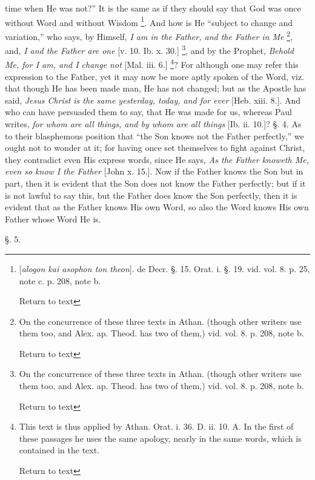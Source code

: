 time when He was not?'' It is the same as if they should say that God
was once without Word and without Wisdom \footnote{[\emph{alogon kai asophon ton theon}]. de Decr. §. 15. Orat. i. §.
19. vid. vol. 8. p. 25, note c. p. 208, note b.

Return to text}. And how is He ``subject to change and variation,'' who says, by
Himself, \emph{I am in the Father, and the Father in Me} \footnote{On the concurrence of these three texts in Athan. (though other
writers use them too, and Alex. ap. Theod. has two of them,) vid. vol.
8. p. 208, note b.

Return to text}, and, \emph{I and the Father are one} [v. 10. Ib. x. 30.] \footnote{On the concurrence of these three texts in Athan. (though other
writers use them too, and Alex. ap. Theod. has two of them,) vid. vol.
8. p. 208, note b.

Return to text}, and by the Prophet, \emph{Behold Me, for I am, and I change not}
[Mal. iii. 6.] \footnote{This text is thus applied by Athan. Orat. i. 36. D. ii. 10. A. In the
first of these passages he uses the same apology, nearly in the same
words, which is contained in the text.

Return to text}? For
although one may refer this expression to the Father, yet it may now
be more aptly spoken of the Word, viz. that though He has been made
man, He has not changed; but as the Apostle has said, \emph{Jesus Christ
is the same yesterday, today, and for ever} [Heb. xiii. 8.]. And
who can have persuaded them to say, that He was made for us, whereas
Paul writes, \emph{for whom are all things, and by whom are all things}
[Ib. ii. 10.]? §. 4. As to their blasphemous position that ``the Son knows not the Father perfectly,'' we ought not to wonder at it; for
having once set themselves to fight against Christ, they contradict
even His express words, since He says, \emph{As the Father knoweth Me,
even so know I the Father} [John x. 15.]. Now if the Father knows
the Son but in part, then it is evident that the Son does not know the
Father perfectly; but if it is not lawful to say this, but the Father
does know the Son perfectly, then it is evident that as the Father
knows His own Word, so also the Word knows His own Father whose Word
He is.

§. 5.

